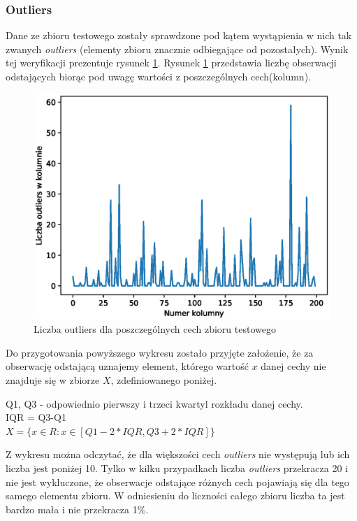\documentclass[12pt]{article}
\begin{document}
\subsubsection{Outliers}
Dane ze zbioru testowego zostały sprawdzone pod kątem wystąpienia w nich tak zwanych \textit{outliers} (elementy zbioru znacznie odbiegające od pozostałych). Wynik tej weryfikacji prezentuje rysunek \ref{outliers}. Rysunek \ref{outliers} przedstawia liczbę obserwacji odstających biorąc pod uwagę wartości z poszczególnych cech(kolumn).

\begin{figure}[H]
\centering 
\includegraphics[width = 472pt]{outliers.eps}
\caption{Liczba outliers dla poszczególnych cech zbioru testowego}
\label{outliers}
\end{figure}


Do przygotowania powyższego wykresu zostało przyjęte założenie, że za obserwację odstającą uznajemy element, którego wartość $x$ danej cechy nie znajduje się w zbiorze $X$, zdefiniowanego poniżej.
\begin{center}
Q1, Q3 - odpowiednio pierwszy i trzeci kwartyl rozkładu danej cechy.\\
IQR = Q3-Q1\\
    $X=\{x\in R : x \in \left[Q1-2*IQR, Q3+2*IQR\right]\}$
\end{center}
Z wykresu można odczytać, że dla większości cech \textit{outliers} nie występują lub ich liczba jest poniżej 10. Tylko w kilku przypadkach liczba  \textit{outliers} przekracza 20 i nie jest wykluczone, że obserwacje odstające różnych cech pojawiają się dla tego samego elementu zbioru. W odniesieniu do liczności całego zbioru liczba ta jest bardzo mała i nie przekracza 1\%. 
\end{document}
